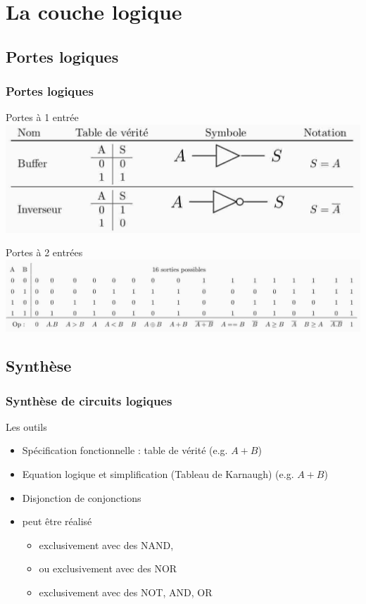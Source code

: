 \documentclass{beamer}
\begin{document}


\section{La couche logique}

\subsection{Portes logiques}
\begin{frame}
\frametitle{Portes logiques}
\begin{block}{Portes à 1 entrée}
\centering\includegraphics[width=0.5\linewidth]{Figs/porte1ent.pdf}
\end{block}
\begin{block}{Portes à 2 entrées}
\centering\includegraphics[width=\linewidth]{Figs/porte2ent.pdf}
\end{block}
\end{frame}

\subsection{Synthèse}
\begin{frame}
\frametitle{Synthèse de circuits logiques}
\begin{block}{Les outils}
\begin{itemize}
\item Spécification fonctionnelle : table de vérité (e.g. $A + B$)
\item Equation logique et simplification (Tableau de Karnaugh) (e.g. $A + B$)
\item Disjonction de conjonctions
\item peut être réalisé 
  \begin{itemize}
  \item exclusivement avec des NAND,
  \item ou exclusivement avec des NOR
  \item exclusivement avec des NOT, AND, OR
  \end{itemize}
\end{itemize}
\end{block}
\end{frame}
\end{document}
